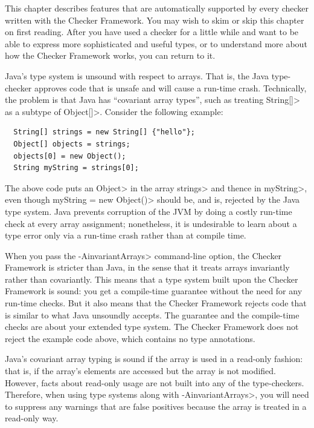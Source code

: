 \htmlhr
{}

This chapter describes features that are automatically supported by every
checker written with the Checker Framework.
You may wish to skim or skip this chapter on first reading.  After you have
used a checker for a little while and want to be able to express more
sophisticated and useful types, or to understand more about how the Checker
Framework works, you can return to it.



Java's type system is unsound with respect to arrays.  That is, the Java
type-checker approves code that is unsafe and will cause a run-time crash.
Technically, the problem is that Java has ``covariant array types'', such
as treating \<String[]> as a subtype of \<Object[]>.  Consider the
following example:

\begin{Verbatim}
  String[] strings = new String[] {"hello"};
  Object[] objects = strings;
  objects[0] = new Object();
  String myString = strings[0];
\end{Verbatim}

\noindent
The above code puts an \<Object> in the array \<strings> and thence in
\<myString>, even though \<myString = new Object()> should be, and is,
rejected by the Java type system.  Java prevents corruption of the JVM by
doing a costly run-time check at every array assignment; nonetheless, it is
undesirable to learn about a type error only via a run-time crash rather
than at compile time.

When you pass the \<-AinvariantArrays> command-line option,
the Checker Framework is stricter than Java, in the sense that it treats
arrays invariantly rather than covariantly.  This means that a type system
built upon the Checker Framework is sound:  you get a compile-time
guarantee without the need for any run-time checks.  But it also means that
the Checker Framework rejects code that is similar to what Java unsoundly
accepts.  The guarantee and the compile-time checks are about your
extended type system.  The Checker Framework does not reject the example
code above, which contains no type annotations.

Java's covariant array typing is sound if the array is used in a read-only
fashion:  that is, if the array's elements are accessed but the array is
not modified.  However, facts about read-only usage are not built into any of
the type-checkers.  Therefore, when using type systems
along with \<-AinvariantArrays>, you will need to suppress any warnings that
are false positives because the array is treated in a read-only way.


